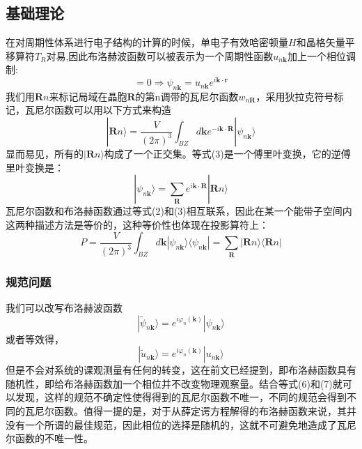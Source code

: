 \subsection{基础理论}
在对周期性体系进行电子结构的计算的时候，单电子有效哈密顿量$H$和晶格矢量平移算符$T_{R}$对易,因此布洛赫波函数可以被表示为一个周期性函数$u_{n\bm{k}}$加上一个相位调制:
\begin{equation}
[H,T_{R}]=0\Rightarrow \psi_{n\bm{k}}=u_{n\bm{k}}e^{i \bm{k} \cdot \bm{r}}
\end{equation}
我们用$\bm{R}n$来标记局域在晶胞$\bm{R}$的第n调带的瓦尼尔函数$w_{n\bm{R}}$，采用狄拉克符号标记，瓦尼尔函数可以用以下方式来构造
\begin{equation}
|\bm{R}n \rangle= \frac{V}{(2\pi)^3}\int_{BZ}d\bm{k}e^{-i\bm{k}\cdot\bm{R}}|\psi_{n\bm{k}}\rangle
\end{equation}
显而易见，所有的$|\bm{R}n \rangle$构成了一个正交集。等式(3)是一个傅里叶变换，它的逆傅里叶变换是：
\begin{equation}
|\psi_{n\bm{k}}\rangle= \sum_{\bm{R}}e^{i\bm{k}\cdot\bm{R}}|\bm{R}n \rangle
\end{equation}
瓦尼尔函数和布洛赫函数通过等式(2)和(3)相互联系，因此在某一个能带子空间内这两种描述方法是等价的，这种等价性也体现在投影算符上：
\begin{equation}
P= \frac{V}{(2\pi)^3} \int_{BZ}d\bm{k}  |\psi_{n\bm{k}}\rangle \langle\psi_{n\bm{k}} |=\sum_{\bm{R}}|\bm{R}n \rangle \langle \bm {R}n |
\end{equation}
\subsubsection{规范问题}
我们可以改写布洛赫波函数
\begin{equation}
|\widetilde \psi_{n\bm{k}}\rangle= e^{i \varphi_{n}(\bm{k})} |\psi_{n\bm{k}}\rangle
\end{equation}
或者等效得，
\begin{equation}
|\widetilde u_{n\bm{k}}\rangle= e^{i \varphi_{n}(\bm{k})} |u_{n\bm{k}}\rangle
\end{equation}
但是不会对系统的课观测量有任何的转变，这在前文已经提到，即布洛赫函数具有随机性，即给布洛赫函数加一个相位并不改变物理观察量。结合等式(6)和(7)就可以发现，这样的规范不确定性使得得到的瓦尼尔函数不唯一，不同的规范会得到不同的瓦尼尔函数。值得一提的是，对于从薛定谔方程解得的布洛赫函数来说，其并没有一个所谓的最佳规范，因此相位的选择是随机的，这就不可避免地造成了瓦尼尔函数的不唯一性。
